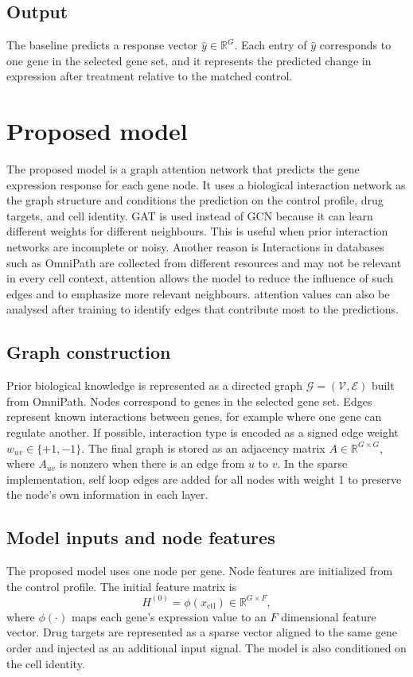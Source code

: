 \subsection{Output}
The baseline predicts a response vector $\hat{y}\in\mathbb{R}^{G}$. Each entry of $\hat{y}$ corresponds to one gene in the selected gene set, and it represents the predicted change in expression after treatment relative to the matched control.

\section{Proposed model}
The proposed model is a graph attention network that predicts the gene expression response for each gene node. It uses a biological interaction network as the graph structure and conditions the prediction on the control profile, drug targets, and cell identity. GAT is used instead of GCN because it can learn different weights for different neighbours. This is useful when prior interaction networks are incomplete or noisy. Another reason is Interactions in databases such as OmniPath are collected from different resources and may not be relevant in every cell context, attention allows the model to reduce the influence of such edges and to emphasize more relevant neighbours. attention values can also be analysed after training to identify edges that contribute most to the predictions.
\subsection{Graph construction}
Prior biological knowledge is represented as a directed graph $\mathcal{G}=(\mathcal{V},\mathcal{E})$ built from OmniPath. Nodes correspond to genes in the selected gene set. Edges represent known interactions between genes, for example where one gene can regulate another. If possible, interaction type is encoded as a signed edge weight $w_{uv}\in\{+1,-1\}$. The final graph is stored as an adjacency matrix $A\in\mathbb{R}^{G\times G}$, where $A_{uv}$ is nonzero when there is an edge from $u$ to $v$. In the sparse implementation, self loop edges are added for all nodes with weight 1 to preserve the node's own information in each layer.

\subsection{Model inputs and node features}
The proposed model uses one node per gene. Node features are initialized from the control profile. The initial feature matrix is
\begin{equation}
H^{(0)} = \phi(x_{\mathrm{ctl}}) \in \mathbb{R}^{G \times F},
\end{equation}
where $\phi(\cdot)$ maps each gene's expression value to an $F$ dimensional feature vector. Drug targets are represented as a sparse vector aligned to the same gene order and injected as an additional input signal. The model is also conditioned on the cell identity.

